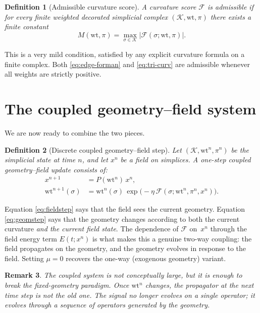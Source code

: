 \documentclass[11pt]{article}
\newtheorem{definition}{Definition}[section]
\newtheorem{remark}[definition]{Remark}
\newcommand{\K}{\mathcal{K}}
\newcommand{\wt}{\mathrm{wt}}
\newcommand{\Flow}{\mathcal{F}}
\begin{document}
\begin{definition}[Admissible curvature score]
A curvature score $\Flow$ is \emph{admissible} if for every finite weighted decorated simplicial complex $(\K,\wt,\pi)$ there exists a finite constant
\[
M(\wt,\pi)=\max_{\sigma\in\K} |\Flow(\sigma;\wt,\pi)|.
\]
\end{definition}

This is a very mild condition, satisfied by any explicit curvature formula on a finite complex.  Both \eqref{eq:edge-forman} and \eqref{eq:tri-curv} are admissible whenever all weights are strictly positive.

\section{The coupled geometry--field system}

We are now ready to combine the two pieces.

\begin{definition}[Discrete coupled geometry--field step]
Let $(\K,\wt^n,\pi^n)$ be the simplicial state at time $n$, and let $x^n$ be a field on simplices. A one-step coupled geometry--field update consists of:
\begin{align}
x^{n+1} &= P(\wt^n)\,x^n, \label{eq:fieldstep}\\
\wt^{n+1}(\sigma)&=\wt^n(\sigma)\,\exp\!\bigl(-\eta \,\Flow(\sigma;\wt^n,\pi^n,x^n)\bigr). \label{eq:geomstep}
\end{align}
\end{definition}

Equation \eqref{eq:fieldstep} says that the field sees the current geometry.  Equation \eqref{eq:geomstep} says that the geometry changes according to both the current curvature \emph{and the current field state}.  The dependence of $\Flow$ on~$x^n$ through the field energy term $E(t;x^n)$ is what makes this a genuine two-way coupling: the field propagates on the geometry, and the geometry evolves in response to the field.  Setting $\mu=0$ recovers the one-way (exogenous geometry) variant.

\begin{remark}
The coupled system is not conceptually large, but it is enough to break the fixed-geometry paradigm. Once $\wt^n$ changes, the propagator at the next time step is not the old one. The signal no longer evolves on a single operator; it evolves through a sequence of operators generated by the geometry.
\end{remark}
\end{document}
